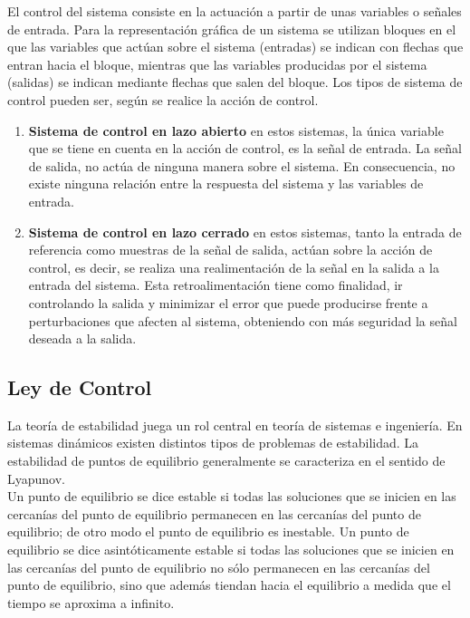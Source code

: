 \documentclass[oneside,onecolumn]{article}
\begin{document}
El control del sistema consiste en la actuación a partir de unas variables o señales de entrada. Para la representación gráfica de un sistema se utilizan bloques en el que las variables que actúan sobre el sistema (entradas) se indican con flechas que entran hacia el bloque, mientras que las variables producidas por el sistema (salidas) se indican mediante flechas que salen del bloque. Los tipos de sistema de control pueden ser, según se realice la acción de control.\\

\begin{enumerate}
\item \textbf{Sistema de control en lazo abierto} en estos sistemas, la única variable que se tiene en cuenta en la acción de control, es la señal de entrada. La señal de salida, no actúa de ninguna manera sobre el sistema. En consecuencia, no existe ninguna relación entre la respuesta del sistema y las variables de entrada.
\item \textbf{Sistema de control en lazo cerrado} en estos sistemas, tanto la entrada de referencia como muestras de la señal de salida, actúan sobre la acción de control, es decir, se realiza una realimentación de la señal en la salida a la entrada del sistema. Esta retroalimentación tiene como finalidad, ir controlando la salida y minimizar el error que puede producirse frente a perturbaciones que afecten al sistema, obteniendo con más seguridad la señal deseada a la salida.
\end{enumerate}

\subsection{Ley de Control}

La teoría de estabilidad juega un rol central en teoría de sistemas e ingeniería. En sistemas dinámicos existen distintos tipos de problemas de estabilidad. La estabilidad de puntos de equilibrio generalmente se caracteriza en el sentido de Lyapunov. \\

Un punto de equilibrio se dice estable si todas las soluciones que se inicien en las cercanías del punto de equilibrio permanecen en las cercanías del punto de equilibrio; de otro modo el punto de equilibrio es inestable. Un punto de equilibrio se dice asintóticamente estable si todas las soluciones que se inicien en las cercanías del punto de equilibrio no sólo permanecen en las cercanías del punto de equilibrio, sino que además tiendan hacia el equilibrio a medida que el tiempo se aproxima a infinito.
\end{document}
